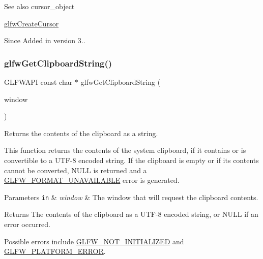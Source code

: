 \begin{DoxySeeAlso}{See also}
cursor\+\_\+object 

\hyperlink{group__input_ga21fc9f020f062db88813aa722c30ba2c}{glfw\+Create\+Cursor}
\end{DoxySeeAlso}
\begin{DoxySince}{Since}
Added in version 3.. 
\end{DoxySince}
\mbox{\label{group__input_ga315b28b05797d00fe7cdf1ecfdc638dc}} 
\subsubsection{\texorpdfstring{glfw\+Get\+Clipboard\+String()}{glfwGetClipboardString()}}
{\footnotesize\ttfamily G\+L\+F\+W\+A\+PI const char $\ast$ glfw\+Get\+Clipboard\+String (\begin{DoxyParamCaption}\item[{\hyperlink{group__window_ga3c96d80d363e67d13a41b5d1821f3242}{G\+L\+F\+Wwindow} $\ast$}]{window }\end{DoxyParamCaption})}



Returns the contents of the clipboard as a string. 

This function returns the contents of the system clipboard, if it contains or is convertible to a U\+T\+F-\/8 encoded string. If the clipboard is empty or if its contents cannot be converted, {\ttfamily N\+U\+LL} is returned and a \hyperlink{group__errors_ga196e125ef261d94184e2b55c05762f14}{G\+L\+F\+W\+\_\+\+F\+O\+R\+M\+A\+T\+\_\+\+U\+N\+A\+V\+A\+I\+L\+A\+B\+LE} error is generated.


\begin{DoxyParams}[1]{Parameters}
\mbox{\tt in}  & {\em window} & The window that will request the clipboard contents. \\
\hline
\end{DoxyParams}
\begin{DoxyReturn}{Returns}
The contents of the clipboard as a U\+T\+F-\/8 encoded string, or {\ttfamily N\+U\+LL} if an error occurred.
\end{DoxyReturn}
Possible errors include \hyperlink{group__errors_ga2374ee02c177f12e1fa76ff3ed15e14a}{G\+L\+F\+W\+\_\+\+N\+O\+T\+\_\+\+I\+N\+I\+T\+I\+A\+L\+I\+Z\+ED} and \hyperlink{group__errors_gad44162d78100ea5e87cdd38426b8c7a1}{G\+L\+F\+W\+\_\+\+P\+L\+A\+T\+F\+O\+R\+M\+\_\+\+E\+R\+R\+OR}.

